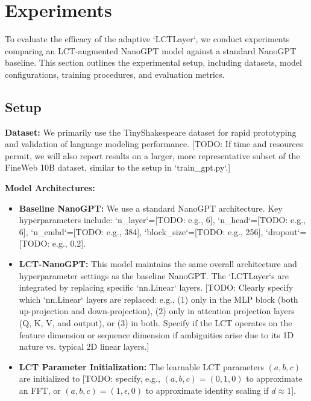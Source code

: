 \section{Experiments}
\label{sec:experiments}

To evaluate the efficacy of the adaptive `LCTLayer`, we conduct experiments comparing an LCT-augmented NanoGPT model against a standard NanoGPT baseline. This section outlines the experimental setup, including datasets, model configurations, training procedures, and evaluation metrics.

\subsection{Setup}

\textbf{Dataset:} We primarily use the TinyShakespeare dataset for rapid prototyping and validation of language modeling performance. [TODO: If time and resources permit, we will also report results on a larger, more representative subset of the FineWeb 10B dataset, similar to the setup in `train_gpt.py`.]

\textbf{Model Architectures:}
\begin{itemize}
  \item \textbf{Baseline NanoGPT:} We use a standard NanoGPT architecture. Key hyperparameters include: `n_layer`=[TODO: e.g., 6], `n_head`=[TODO: e.g., 6], `n_embd`=[TODO: e.g., 384], `block_size`=[TODO: e.g., 256], `dropout`=[TODO: e.g., 0.2].
  \item \textbf{LCT-NanoGPT:} This model maintains the same overall architecture and hyperparameter settings as the baseline NanoGPT. The `LCTLayer`s are integrated by replacing specific `nn.Linear` layers. [TODO: Clearly specify which `nn.Linear` layers are replaced: e.g., (1) only in the MLP block (both up-projection and down-projection), (2) only in attention projection layers (Q, K, V, and output), or (3) in both. Specify if the LCT operates on the feature dimension or sequence dimension if ambiguities arise due to its 1D nature vs. typical 2D linear layers.]

  \item \textbf{LCT Parameter Initialization:} The learnable LCT parameters \((a,b,c)\) are initialized to [TODO: specify, e.g., \((a,b,c) = (0,1,0)\) to approximate an FFT, or \((a,b,c) = (1, \epsilon, 0)\) to approximate identity scaling if \(d \approx 1\)].
\end{itemize}

